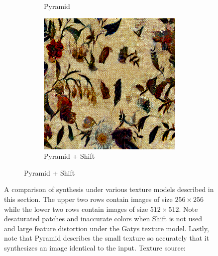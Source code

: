 \begin{figure}[ht]
\begin{subfigure}{0.8\textwidth}
\begin{subfigure}{0.32\textwidth}
            \caption{Pyramid}
            \label{fig:methods_comparison_large-pyramid}
        \end{subfigure}
        \hfill
        \begin{subfigure}{0.32\textwidth}
            \centering
            \includegraphics[width=\textwidth]{images/03-comparison_large_pyramid_shift.jpg}
            \caption{Pyramid + Shift}
            \label{fig:methods_comparison_large-pyramid_shift}
        \end{subfigure}
    \end{subfigure}
    \caption{A comparison of synthesis under various texture models described in this section. The upper two rows contain images of size \(256 \times 256\) while the lower two rows contain images of size \(512 \times 512\). Note desaturated patches and inaccurate colors when Shift is not used and large feature distortion under the Gatys texture model. Lastly, note that Pyramid describes the small texture so accurately that it synthesizes an image identical to the input. Texture source: \citet{Pixar128}}
    \label{fig:methods_comparison_small}
\end{figure}